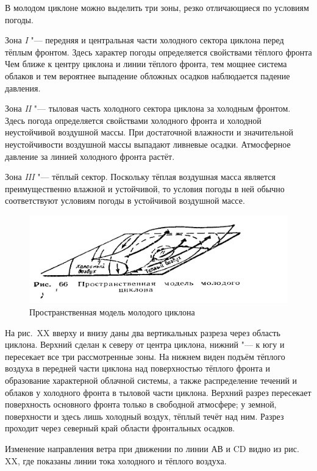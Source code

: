 \documentclass[a4paper, 12pt, twoside, draft, book, russian, fittopage, cyremdash, openright]{ncc}
\begin{document}
В молодом циклоне можно выделить три зоны, резко отличающиеся по условиям погоды.

Зона \textit{I} "--- передняя и центральная части холодного сектора
циклона перед тёплым фронтом. Здесь характер погоды определяется
свойствами тёплого фронта Чем ближе к центру циклона и линии тёплого
фронта, тем мощнее система облаков и тем вероятнее выпадение обложных
осадков наблюдается падение давления.

Зона \textit{II} "--- тыловая часть холодного сектора циклона за холодным
фронтом. Здесь погода определяется свойствами холодного фронта и
холодной неустойчивой воздушной массы. При достаточной влажности и
значительной неустойчивости воздушной массы выпадают ливневые
осадки. Атмосферное давление за линией холодного фронта растёт.

Зона \textit{III} "--- тёплый сектор. Поскольку тёплая воздушная масса
является преимущественно влажной и устойчивой, то условия погоды в
ней обычно соответствуют условиям погоды в устойчивой воздушной массе.

\begin{figure}[htb]
   \centering
   \includegraphics[scale=1]{13_cyclon_model.pdf}
   \caption{Пространственная модель молодого циклона}
   \label{fig:cyclon_model}
\end{figure}

На рис.~XX вверху и внизу даны два вертикальных разреза через область
циклона. Верхний сделан к северу от центра циклона, нижний "--- к югу и
пересекает все три рассмотренные зоны. На нижнем виден подъём тёплого
воздуха в передней части циклона над поверхностью тёплого фронта и
образование характерной облачной системы, а также распределение
течений и облаков у холодного фронта в тыловой части циклона. Верхний
разрез пересекает поверхность основного фронта только в свободной
атмосфере; у земной, поверхности и здесь лишь холодный воздух, тёплый
течёт над ним. Разрез проходит через северный край области фронтальных
осадков.

Изменение направления ветра при движении по линии АВ и CD видно из
рис. XX, где показаны линии тока холодного и тёплого воздуха.
\end{document}
